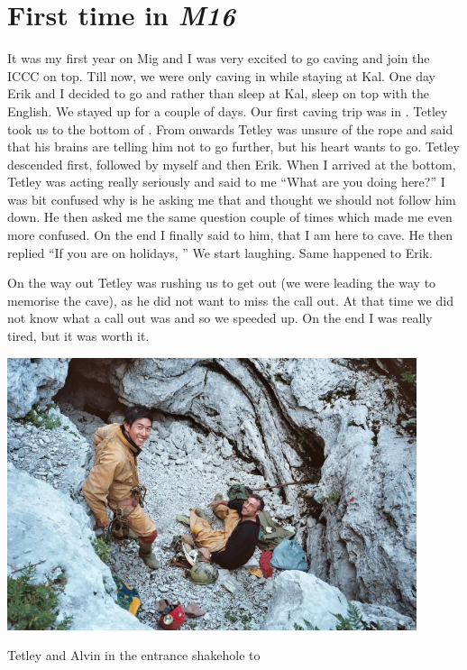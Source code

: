 \section{\texorpdfstring{First time in
\emph{M16}}{First time in M16}}


It was my first year on Mig and I was very excited to go caving and join
the ICCC on top. Till now, we were only caving in  while
staying at Kal. One day Erik and I decided to go and rather than sleep
at Kal, sleep on top with the English. We stayed up for a couple of
days. Our first caving trip was in . Tetley took us to the
bottom of . From  onwards Tetley was unsure of the rope and
said that his brains are telling him not to go further, but his heart
wants to go. Tetley descended  first, followed by myself and then
Erik. When I arrived at the bottom, Tetley was acting really seriously
and said to me ``What are you doing here?'' I was bit confused why is he
asking me that and thought we should not follow him down. He then asked
me the same question couple of times which made me even more confused.
On the end I finally said to him, that I am here to cave. He then
replied ``If you are on holidays, '' We start laughing. Same happened to Erik.

On the way out Tetley was rushing us to get out (we were leading the way
to memorise the cave), as he did not want to miss the call out. At that
time we did not know what a call out was and so we speeded up. On the
end I was really tired, but it was worth it.


\begin{pagefigure}
\checkoddpage \ifoddpage \forcerectofloat \else \forceversofloat \fi
   \centering
\includegraphics[width = 0.9\textwidth]{2007/m16/jarvist frost gr1 film1 -004_1--orig.jpg}
\caption{Tetley and Alvin in the entrance shakehole to \protect{} }
\end{pagefigure}
